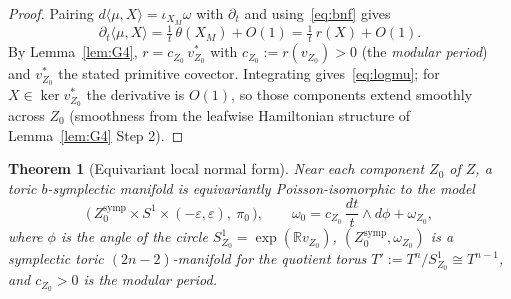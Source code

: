 \documentclass{amsart}
\newtheorem{theorem}{Theorem}
\theoremstyle{definition}
\begin{document}
\begin{proof}
Pairing $d\langle\mu,X\rangle=\iota_{X_M}\omega$ with $\partial_t$ and
using~\eqref{eq:bnf} gives
\[
\partial_t\langle\mu,X\rangle=\tfrac1t\,\theta(X_M)+O(1)
=\tfrac1t\,r(X)+O(1).
\]
By Lemma~\ref{lem:G4}, $r=c_{Z_0}\,v^*_{Z_0}$ with $c_{Z_0}:=r(v_{Z_0})>0$ (the
\emph{modular period}) and $v^*_{Z_0}$ the stated primitive covector.
Integrating gives~\eqref{eq:logmu}; for $X\in\ker v^*_{Z_0}$ the derivative is
$O(1)$, so those components extend smoothly across $Z_0$ (smoothness from the
leafwise Hamiltonian structure of Lemma~\ref{lem:G4} Step 2).
\end{proof}

\begin{theorem}[Equivariant local normal form]\label{thm:localmodel}
Near each component $Z_0$ of $Z$, a toric $b$-symplectic manifold is
equivariantly Poisson-isomorphic to the model
\[
\bigl(\,Z_0^{\mathrm{symp}}\times S^1\times(-\varepsilon,\varepsilon),\ \pi_0\,\bigr),
\qquad
\omega_0=c_{Z_0}\,\frac{dt}{t}\wedge d\phi+\omega_{Z_0},
\]
where $\phi$ is the angle of the circle $S^1_{Z_0}=\exp(\mathbb R v_{Z_0})$,
$(Z_0^{\mathrm{symp}},\omega_{Z_0})$ is a symplectic toric $(2n-2)$-manifold for
the quotient torus $T':=T^n/S^1_{Z_0}\cong T^{n-1}$, and $c_{Z_0}>0$ is the
modular period.
\end{theorem}
\end{document}

